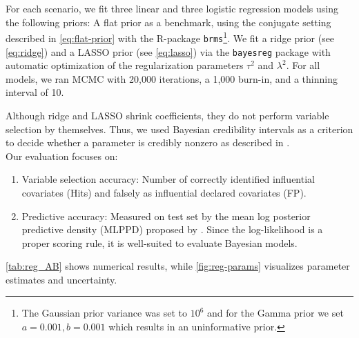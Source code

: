 For each scenario, we fit three linear and three logistic regression models using the following priors: A flat prior as a benchmark, using the conjugate setting described in \autoref{eq:flat-prior} with the R-package \texttt{brms}\footnote{The Gaussian prior variance was set to $10^6$ and for the Gamma prior we set $a = 0.001, b=0.001$ which results in an uninformative prior.}.
We fit a ridge prior (see \autoref{eq:ridge}) and a LASSO prior (see \autoref{eq:lasso}) via the \texttt{bayesreg} package with automatic optimization of the regularization parameters $\tau^2$ and $\lambda^2$.
For all models, we ran MCMC with 20,000 iterations, a 1,000 burn-in, and a thinning interval of 10.

Although ridge and LASSO shrink coefficients, they do not perform variable selection by themselves.
Thus, we used Bayesian credibility intervals as a criterion to decide whether a parameter is credibly nonzero as described in \citet{van_erp_shrinkage_2019}.\\

Our evaluation focuses on:
\begin{enumerate}
    \item Variable selection accuracy: Number of correctly identified influential covariates (Hits) and falsely as influential declared covariates (FP).
    \item Predictive accuracy: Measured on test set by the mean log posterior predictive density (MLPPD) proposed by \citet{gelman_understanding_2013}.
    Since the log-likelihood is a proper scoring rule, it is well-suited to evaluate Bayesian models.
\end{enumerate}

\autoref{tab:reg_AB} shows numerical results, while \autoref{fig:reg-params} visualizes parameter estimates and uncertainty.

